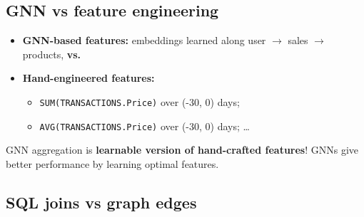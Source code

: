 \subsection{GNN vs feature engineering}\label{sec:lec12-vsfe}

\begin{itemize}
  \item \textbf{GNN-based features:} embeddings learned along user $\to$ sales $\to$
    products, \textbf{vs.}
  \item \textbf{Hand-engineered features:}
    \begin{itemize}
      \item \texttt{SUM(TRANSACTIONS.Price)} over (-30, 0) days;
      \item \texttt{AVG(TRANSACTIONS.Price)} over (-30, 0) days; \dots
    \end{itemize}
\end{itemize}
\begin{keyidea}
  GNN aggregation is \textbf{learnable version of hand-crafted features}! GNNs give better
  performance by learning optimal features.
\end{keyidea}

\subsection{SQL joins vs graph edges}\label{sec:lec12-joins}

